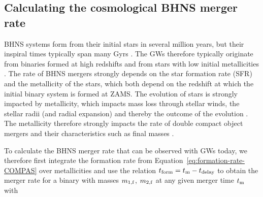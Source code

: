 \documentclass[twocolumn]{aastex63}
\newcommand{\todo}[1]{\textcolor{red}{[To do: #1]}}
\newcommand\bhnsSingle{BHNS\xspace}
\newcommand{\monef}{\ensuremath{m_{1,\rm{f}}}\xspace}
\newcommand{\mtwof}{\ensuremath{m_{2,\rm{f}}}\xspace}
\newcommand{\tdelay}{\ensuremath{{t}_{\rm{delay}}}\xspace}
\newcommand{\tform}{\ensuremath{{t}_{\rm{form}}}\xspace}
\newcommand{\tmerger}{\ensuremath{{t}_{\rm{m}}}\xspace}
\begin{document}
\subsection{Calculating the cosmological \bhnsSingle merger rate}
\label{subsec:method-MSSFR}
\bhnsSingle systems form from their initial stars in several million years, but their inspiral times typically span many Gyrs \citep{1994MNRAS.268..871T, 1998A&A...332..173P, 1999ApJ...526..152F, 2002ApJ...572..407B, 2016A&A...589A..64M,Mapelli:2017hqk}. 
%
The \acp{GW}  therefore typically originate from binaries formed at high redshifts and  from stars with low initial metallicities  \citep[see e.g.][]{2018MNRAS.480.2704L}.  
%
The rate of \bhnsSingle mergers strongly depends on the star formation rate (SFR) and the metallicity of the stars, which both depend on the redshift at which the initial binary system is formed at ZAMS.  
The evolution of stars is strongly impacted by metallicity, which impacts mass loss through stellar winds,  the stellar radii (and radial expansion)  and  thereby the outcome of the evolution \citep[e.g.][]{1992A&A...264..105M}. The metallicity therefore strongly  impacts the rate of double compact object mergers and their characteristics such as final masses  \citep[see e.g.][]{2016MNRAS.462.3302E,2019MNRAS.482.5012C}.


To calculate the \bhnsSingle merger rate  that can be observed with \acp{GW} today, we therefore first integrate the formation rate from Equation~\ref{eq:formation-rate-COMPAS} over  metallicities and use  the relation $\tform = \tmerger - \tdelay$ to obtain the merger rate for a binary with masses \monef, \mtwof at any given merger time \tmerger with
\end{document}
